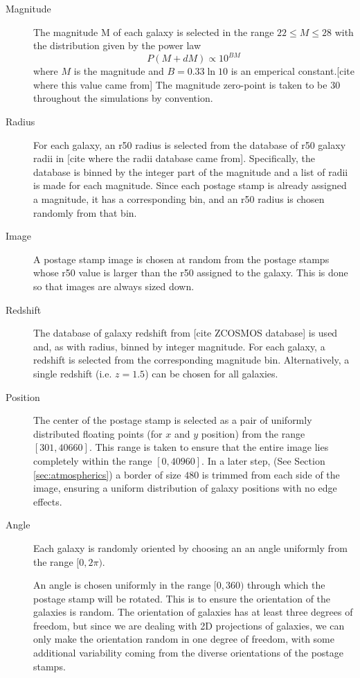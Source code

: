 \documentclass[10pt,twoside]{article}
\theoremstyle{definition}
\theoremstyle{exercise}
\begin{document}
\begin{description}
  \item[Magnitude] The magnitude M of each galaxy is selected in the range $22 \le M \le 28$ with the distribution given by the power law
    \begin{equation}
      P(M+dM) \propto 10^{BM}
      \label{eq:mag_power_law}
    \end{equation}
    where $M$ is the magnitude and $B = 0.33\ln 10$ is an emperical constant.[cite where this value came from] The magnitude zero-point is taken to be 30 throughout the simulations by convention.

  \item[Radius] 
For each galaxy, an r50 radius is selected from the database of r50 galaxy radii in [cite where the radii database came from]. Specifically, the database is binned by the integer part of the magnitude  and a list of radii is made for each magnitude. Since each postage stamp is already assigned a magnitude, it has a corresponding bin, and an r50 radius is chosen randomly from that bin.

  \item[Image] A postage stamp image is chosen at random from the postage stamps whose r50 value is larger than the r50 assigned to the galaxy. This is done so that images are always sized down.

  \item[Redshift] The database of galaxy redshift from [cite ZCOSMOS database] is used and, as with radius, binned by integer magnitude. For each galaxy, a redshift is selected from the corresponding magnitude bin. Alternatively, a single redshift (i.e. $z=1.5$) can be chosen for all galaxies.

  \item[Position] The center of the postage stamp is selected as a pair of uniformly distributed floating points (for $x$ and $y$ position) from the range $[301, 40660]$. This range is taken to ensure that the entire image lies completely within the range $[0,40960]$. In a later step, (See Section \ref{sec:atmospherics}) a border of size $480$ is trimmed from each side of the image, ensuring a uniform distribution of galaxy positions with no edge effects.

  \item[Angle] 
  Each galaxy is randomly oriented by choosing an an angle uniformly from the range $[0,2\pi)$. 
  
  An angle is chosen uniformly in the range $[0,360)$ through which the postage stamp will be rotated. This is to ensure the orientation of the galaxies is random. The orientation of galaxies has at least three degrees of freedom, but since we are dealing with 2D projections of galaxies, we can only make the orientation random in one degree of freedom, with some additional variability coming from the diverse orientations of the postage stamps. 
\end{description}
\end{document}
